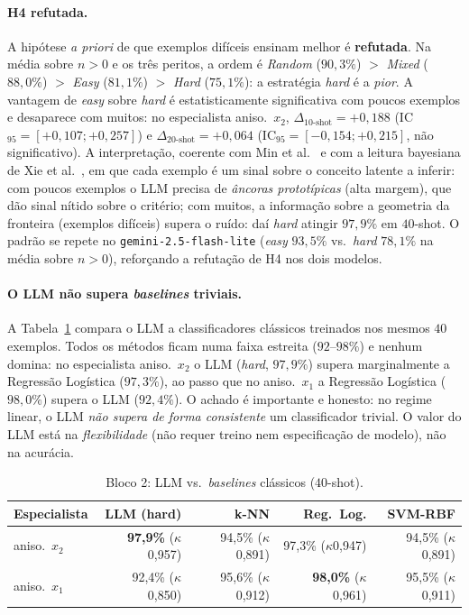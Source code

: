 \documentclass[12pt,a4paper]{article}
\begin{document}
\paragraph{H4 refutada.}
A hipótese \emph{a priori} de que exemplos difíceis ensinam melhor é \textbf{refutada}. Na
média sobre $n>0$ e os três peritos, a ordem é \emph{Random} ($90{,}3\%$) $>$ \emph{Mixed}
($88{,}0\%$) $>$ \emph{Easy} ($81{,}1\%$) $>$ \emph{Hard} ($75{,}1\%$): a estratégia
\emph{hard} é a \emph{pior}. A vantagem de \emph{easy} sobre \emph{hard} é estatisticamente
significativa com poucos exemplos e desaparece com muitos: no especialista aniso.\ $x_2$,
$\Delta_{10\text{-shot}} = +0{,}188$ (IC$_{95}=[+0{,}107;+0{,}257]$) e
$\Delta_{20\text{-shot}} = +0{,}064$ (IC$_{95}=[-0{,}154;+0{,}215]$, não significativo). A
interpretação, coerente com Min et al.~\cite{minRethinkingRole2022} e com a leitura
bayesiana de Xie et al.~\cite{xieExplanationInContext2022}, em que cada exemplo é um sinal
sobre o conceito latente a inferir: com poucos exemplos o
LLM precisa de \emph{âncoras prototípicas} (alta margem), que dão sinal nítido sobre o
critério; com muitos, a informação sobre a
geometria da fronteira (exemplos difíceis) supera o ruído: daí \emph{hard} atingir $97{,}9\%$
em $40$-shot. O padrão se repete no \texttt{gemini-2.5-flash-lite} (\emph{easy} $93{,}5\%$
vs.\ \emph{hard} $78{,}1\%$ na média sobre $n>0$), reforçando a refutação de H4 nos dois
modelos.

\paragraph{O LLM não supera \emph{baselines} triviais.}
A Tabela~\ref{tab:baselines} compara o LLM a classificadores clássicos treinados nos mesmos
$40$ exemplos. Todos os métodos ficam numa faixa estreita ($92$–$98\%$) e nenhum domina: no
especialista aniso.\ $x_2$ o LLM (\emph{hard}, $97{,}9\%$) supera marginalmente a Regressão
Logística ($97{,}3\%$), ao passo que no aniso.\ $x_1$ a Regressão Logística ($98{,}0\%$)
supera o LLM ($92{,}4\%$). O achado é importante e honesto: no regime linear, o LLM
\emph{não supera de forma consistente} um classificador trivial. O valor do LLM está na
\emph{flexibilidade} (não requer treino nem especificação de modelo), não na acurácia.

\begin{table}[ht]
\centering
\caption{Bloco 2: LLM vs.\ \emph{baselines} clássicos ($40$-shot).}
\label{tab:baselines}
\begin{tabular}{lrrrr}
\toprule
\textbf{Especialista} & \textbf{LLM (hard)} & \textbf{k-NN} &
\textbf{Reg.\ Log.} & \textbf{SVM-RBF} \\
\midrule
aniso.\ $x_2$ & \textbf{97,9\%} ($\kappa$0,957) & 94,5\% ($\kappa$0,891) &
  97,3\% ($\kappa$0,947) & 94,5\% ($\kappa$0,891) \\
aniso.\ $x_1$ & 92,4\% ($\kappa$0,850)         & 95,6\% ($\kappa$0,912)    &
  \textbf{98,0\%} ($\kappa$0,961) & 95,5\% ($\kappa$0,911) \\
\bottomrule
\end{tabular}
\end{table}
\end{document}
